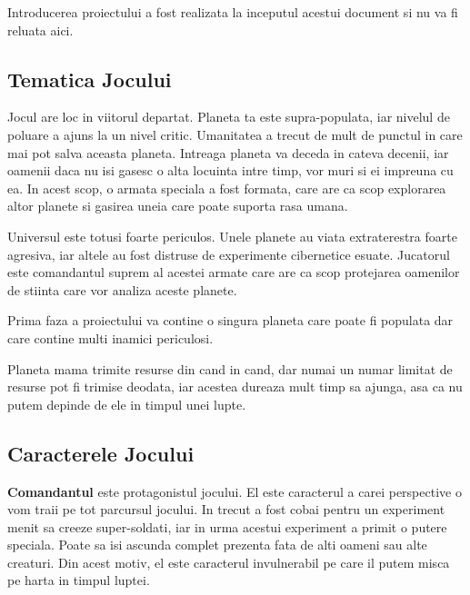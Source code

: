 \documentclass[12pt, a4paper]{article}
\begin{document}
	Introducerea proiectului a fost realizata la inceputul acestui document si nu va fi reluata aici.
	
	
	
	
	
	\subsection{Tematica Jocului}
	
	Jocul are loc in viitorul departat. Planeta ta este supra-populata, iar nivelul de poluare a ajuns la un nivel critic. Umanitatea a trecut de mult de punctul in care mai pot salva aceasta planeta. Intreaga planeta va deceda in cateva decenii, iar oamenii daca nu isi gasesc o alta locuinta intre timp, vor muri si ei impreuna cu ea. In acest scop, o armata speciala a fost formata, care are ca scop explorarea altor planete si gasirea uneia care poate suporta rasa umana.
	\newline
	
	Universul este totusi foarte periculos. Unele planete au viata extraterestra foarte agresiva, iar altele au fost distruse de experimente cibernetice esuate. Jucatorul este comandantul suprem al acestei armate care are ca scop protejarea oamenilor de stiinta care vor analiza aceste planete.
	\newline
	
	Prima faza a proiectului va contine o singura planeta care poate fi populata dar care contine multi inamici periculosi.
	\newline
	
	Planeta mama trimite resurse din cand in cand, dar numai un numar limitat de resurse pot fi trimise deodata, iar acestea dureaza mult timp sa ajunga, asa ca nu putem depinde de ele in timpul unei lupte.
	
	
	
	
	
	\subsection{Caracterele Jocului}
	
	\textbf{Comandantul} este protagonistul jocului. El este caracterul a carei perspective o vom traii pe tot parcursul jocului. In trecut a fost cobai pentru un experiment menit sa creeze super-soldati, iar in urma acestui experiment a primit o putere speciala. Poate sa isi ascunda complet prezenta fata de alti oameni sau alte creaturi. Din acest motiv, el este caracterul invulnerabil pe care il putem misca pe harta in timpul luptei.
	
\end{document}
